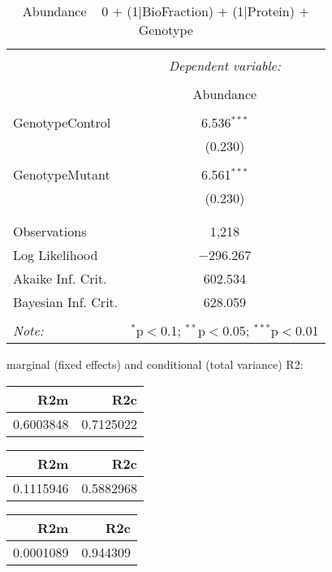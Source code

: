 \documentclass[11pt]{report}
\begin{document}
\begin{table}[!htbp] \centering 
  \caption{Abundance ~ 0 + (1|BioFraction) + (1|Protein) + Genotype} 
  \label{} 
\begin{tabular}{@{\extracolsep{5pt}}lc} 
\\[-1.8ex]\hline 
\hline \\[-1.8ex] 
 & \multicolumn{1}{c}{\textit{Dependent variable:}} \\ 
\cline{2-2} 
\\[-1.8ex] & Abundance \\ 
\hline \\[-1.8ex] 
 GenotypeControl & 6.536$^{***}$ \\ 
  & (0.230) \\ 
  & \\ 
 GenotypeMutant & 6.561$^{***}$ \\ 
  & (0.230) \\ 
  & \\ 
\hline \\[-1.8ex] 
Observations & 1,218 \\ 
Log Likelihood & $-$296.267 \\ 
Akaike Inf. Crit. & 602.534 \\ 
Bayesian Inf. Crit. & 628.059 \\ 
\hline 
\hline \\[-1.8ex] 
\textit{Note:}  & \multicolumn{1}{r}{$^{*}$p$<$0.1; $^{**}$p$<$0.05; $^{***}$p$<$0.01} \\ 
\end{tabular} 
\end{table} 
marginal (fixed effects) and conditional (total variance) R2:

\begin{tabular}{r|r}
\hline
R2m & R2c\\
\hline
0.6003848 & 0.7125022\\
\hline
\end{tabular}

\begin{tabular}{r|r}
\hline
R2m & R2c\\
\hline
0.1115946 & 0.5882968\\
\hline
\end{tabular}

\begin{tabular}{r|r}
\hline
R2m & R2c\\
\hline
0.0001089 & 0.944309\\
\hline
\end{tabular}
\end{document}
